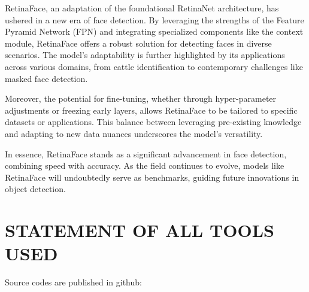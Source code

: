 \documentclass{article}
\begin{document}
RetinaFace, an adaptation of the foundational RetinaNet architecture, has ushered in a new era of face detection. By leveraging the strengths of the Feature Pyramid Network (FPN) and integrating specialized components like the context module, RetinaFace offers a robust solution for detecting faces in diverse scenarios. The model's adaptability is further highlighted by its applications across various domains, from cattle identification to contemporary challenges like masked face detection.

Moreover, the potential for fine-tuning, whether through hyper-parameter adjustments or freezing early layers, allows RetinaFace to be tailored to specific datasets or applications. This balance between leveraging pre-existing knowledge and adapting to new data nuances underscores the model's versatility.

In essence, RetinaFace stands as a significant advancement in face detection, combining speed with accuracy. As the field continues to evolve, models like RetinaFace will undoubtedly serve as benchmarks, guiding future innovations in object detection.


\section{STATEMENT OF ALL TOOLS USED}
\label{sec:statementofalltoolsused}


Source codes are published in github: 





\vfill\pagebreak



\end{document}

